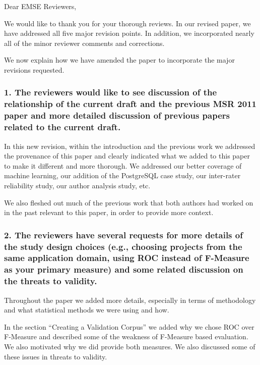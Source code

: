 \documentclass{article}
\begin{document}
Dear EMSE Reviewers,

We would like to thank you for your thorough reviews. In our revised paper,
we have addressed all five  major revision points. In addition, we incorporated nearly all of the
minor reviewer comments and corrections. 

We now explain how we have amended the paper to incorporate the major revisions requested.

\subsubsection*{1. The reviewers would like to see discussion of the relationship of
 the current draft and the previous MSR 2011 paper and more detailed
 discussion of previous papers related to the current draft.}

In this new revision, within the introduction and the previous work we
addressed the provenance of this paper and clearly indicated what we
added to this paper to make it different and more thorough. We
addressed our better coverage of machine learning, our addition of the
PostgreSQL case study, our inter-rater reliability study, our author
analysis study, etc. 

We also fleshed out much of the previous work that both authors had
worked on in the past relevant to this paper, in order to provide more
context.

\subsubsection*{2. The reviewers have several requests for more details of the study
   design choices (e.g., choosing projects from the same application
   domain, using ROC instead of F-Measure as your primary measure) and
   some related discussion on the threats to validity.}

Throughout the paper we added more details, especially in terms of
methodology and what statistical methods we were using and how.

In the section ``Creating a Validation Corpus'' we added why we chose
ROC over F-Measure and described some of the weakness of F-Measure
based evaluation. We also motivated why we did provide both
measures. We also discussed some of these issues in threats to
validity.
\end{document}

